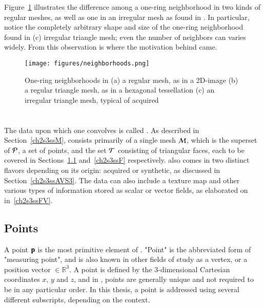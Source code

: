 Figure~\ref{fig:neighborhoods} illustrates the difference among a one-ring neighborhood in two kinds of regular meshes, as well as one in an irregular mesh as found in \tdd{}. In particular, notice the completely arbitrary shape and size of the one-ring neighborhood found in (c) irregular triangle mesh; even the number of neighbors can varies widely. From this observation is where the motivation behind  came.

\begin{figure}
\ffigbox
	{\texttt{[image: figures/neighborhoods.png]}}
	{\caption[One-ring neighborhoods in regular and irregular meshes]{One-ring neighborhoods in (a) a regular mesh, as in a 2D-image (b) a regular triangle mesh, as in a hexagonal tessellation (c) an irregular triangle mesh, typical of acquired \tdd{}}\label{fig:neighborhoods}}
\end{figure}

%
%
%
%
\section{\tdd}
\label{ch2s3}
The data upon which one convolves  is called \tdd{}. As described in Section~\ref{ch2s3ssM}, \tdd{} consists primarily of a single mesh $\mathcal{M}$, which is the superset of $\mathcal{P}$, a set of points, and the set $\mathcal{T}$ consisting of triangular faces, each to be covered in Sections~\ref{ch2s3ssP} and~\ref{ch2s3ssF} respectively. \tdd{} also comes in two distinct flavors depending on its origin: acquired or synthetic, as discussed in Section~\ref{ch2s3ssAVS3}. The data can also include a texture map and other various types of information stored as scalar or vector fields, as elaborated on in~\ref{ch2s3ssFV}.

%
%
%
\subsection{Points}
\label{ch2s3ssP}
A point $\mathbf{p}$ is the most primitive element of \tdd{}. "Point" is the abbreviated form of "measuring point", and is also known in other fields of study as a vertex, or a position vector $\in \mathbb{R}^3$. A point is defined by the 3-dimensional Cartesian coordinates $x$, $y$ and $z$, and in \tdd{}, points are generally unique and not required to be in any particular order. In this thesis, a point is addressed using several different subscripts, depending on the context.

